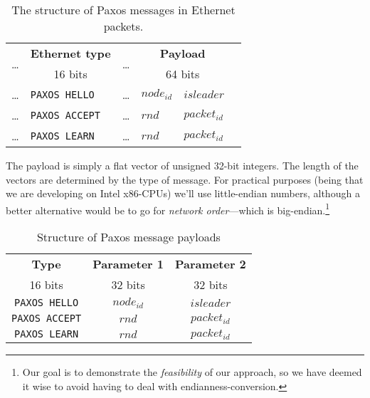 \begin{table}[H]
  \centering
  \begin{tabular}{l|l|l|l|l|l|}
    \hline
      \multirow{2}{*}{\dots} &
      \multicolumn{1}{c|}{\textbf{Ethernet type}} &
      \multirow{2}{*}{\dots} &
      \multicolumn{2}{c|}{\textbf{Payload}} \\

      &
      \multicolumn{1}{c|}{16 bits} &
      &
      \multicolumn{2}{c|}{64 bits} \\

    \hline
      \dots & \texttt{PAXOS HELLO}  &
      \dots & $node_{id}$ & $isleader$ \\

    \hline
      \dots & \texttt{PAXOS ACCEPT} &
      \dots & $rnd$ & $packet_{id}$ \\

    \hline
      \dots & \texttt{PAXOS LEARN} &
      \dots & $rnd$ & $packet_{id}$ \\

    \hline
  \end{tabular}

  \caption{The structure of Paxos messages in Ethernet packets.}
  \label{table:paxos.ethernet.packet}
\end{table}

The payload is simply a flat vector of unsigned 32-bit integers.  The length
of the vectors are determined by the type of message.  For practical
purposes (being that we are developing on Intel
    x86-CPUs) we'll use
little-endian numbers, although a better alternative would be to go for
\textit{network order}---which is big-endian.\footnote{Our goal is to
demonstrate the \textit{feasibility} of our approach, so we have deemed it
wise to avoid having to deal with endianness-conversion.}

\begin{table}[H]
  \centering
  \begin{tabular}{|c|c|c|}
    \hline \textbf{Type} & \textbf{Parameter 1} & \textbf{Parameter 2} \\
           16 bits & 32 bits & 32 bits \\
    \hline \texttt{PAXOS HELLO} & $node_{id}$ & $isleader$ \\
    \hline \texttt{PAXOS ACCEPT} & $rnd$ & $packet_{id}$ \\
    \hline \texttt{PAXOS LEARN} & $rnd$ & $packet_{id}$ \\
    \hline
  \end{tabular}
  \caption{Structure of Paxos message payloads}
  \label{table:paxos.payload.structure}
\end{table}


